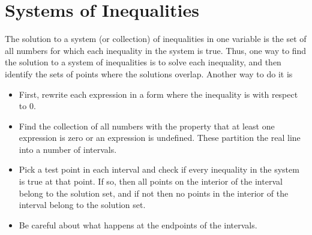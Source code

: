 \documentclass[11pt]{book}               %
\begin{document}
\newpage
\label{section_systems-inequalities}
\section{Systems of Inequalities}

The solution to a system (or collection) of inequalities in one variable is the set of all numbers for which each inequality in the system is true.  
Thus, one way to find the solution to a system of inequalities is to solve each inequality, and then identify the sets of points where the solutions overlap.
Another way to do it is
\begin{itemize}
\item First, rewrite each expression in a form where the inequality is with respect to 0.
\item  Find the collection of all numbers with the property that at least one expression is zero or an expression is undefined.  These partition the real line into a number of intervals.
\item Pick a test point in each interval and check if every inequality in the system is true at that point.  If so, then all points on the interior of the interval belong to the solution set, and if not then no points in the interior of the interval belong to the solution set.
\item Be careful about what happens at the endpoints of the intervals.
\end{itemize}
\end{document}
